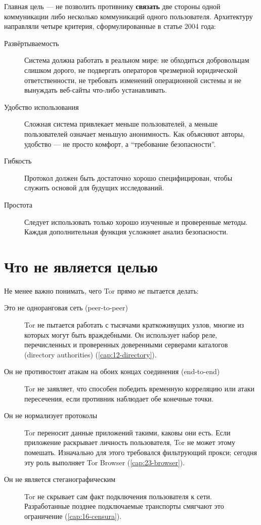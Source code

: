 Главная цель --- не позволить противнику \textbf{связать} две стороны одной коммуникации либо несколько коммуникаций одного пользователя. Архитектуру направляли четыре критерия, сформулированные в статье 2004 года:
\begin{description}
  \item[Развёртываемость] Система должна работать в реальном мире: не обходиться добровольцам слишком дорого, не подвергать операторов чрезмерной юридической ответственности, не требовать изменений операционной системы и не вынуждать веб-сайты что-либо устанавливать.
  \item[Удобство использования] Сложная система привлекает меньше пользователей, а меньше пользователей означает меньшую анонимность. Как объясняют авторы, удобство --- не просто комфорт, а \enquote{требование безопасности}.
  \item[Гибкость] Протокол должен быть достаточно хорошо специфицирован, чтобы служить основой для будущих исследований.
  \item[Простота] Следует использовать только хорошо изученные и проверенные методы. Каждая дополнительная функция усложняет анализ безопасности.
\end{description}

\section{Что не является целью}\label{sec:minaccia-nonobiettivi}

Не менее важно понимать, чего Tor прямо \emph{не} пытается делать:
\begin{description}
  \item[Это не одноранговая сеть (peer-to-peer)] Tor не пытается работать с тысячами краткоживущих узлов, многие из которых могут быть враждебными. Он использует набор реле, перечисленных и проверенных доверенными серверами каталогов (directory authorities) (\cref{cap:12-directory}).
  \item[Он не противостоит атакам на обоих концах соединения (end-to-end)] Tor не заявляет, что способен победить временную корреляцию или атаки пересечения, если противник наблюдает обе конечные точки.
  \item[Он не нормализует протоколы] Tor переносит данные приложений такими, каковы они есть. Если приложение раскрывает личность пользователя, Tor не может этому помешать. Изначально для этого требовался фильтрующий прокси; сегодня эту роль выполняет Tor Browser (\cref{cap:23-browser}).
  \item[Он не является стеганографическим] Tor не скрывает сам факт подключения пользователя к сети. Разработанные позднее подключаемые транспорты смягчают это ограничение (\cref{cap:16-censura}).
\end{description}

